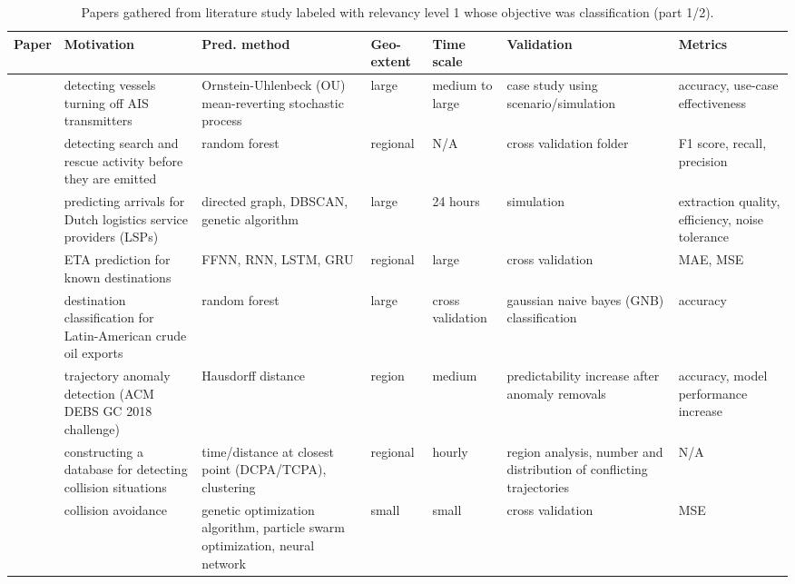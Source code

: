 \noindent
\begin{table}[htbp]
{\small\begin{tabularx}{1.2\textwidth}{p{0.6in} X X p{0.5in} p{0.4in} X p{0.5in}}
    \toprule
    \textbf{Paper} & \textbf{Motivation} & \textbf{Pred. method} & \textbf{Geo-extent} & \textbf{Time scale} & \textbf{Validation} & \textbf{Metrics} \\ \midrule
    \cite{Braca2018DetectingProcess} & detecting vessels turning off AIS transmitters & Ornstein-Uhlenbeck (OU) mean-reverting stochastic process & large & medium to large & case study using scenario/simulation & accuracy, use-case effectiveness \\ \midrule
    \cite{Chatzikokolakis2018MiningRescue} & detecting search and rescue activity before they are emitted & random forest & regional & N/A & cross validation folder & F1 score, recall, precision \\ \midrule
    \cite{Dobrkovic2015UsingData} & predicting arrivals for Dutch logistics service providers (LSPs) & directed graph, DBSCAN, genetic algorithm & large & 24 hours & simulation & extraction quality, efficiency, noise tolerance \\ \midrule
    \cite{ElMekkaoui2020PredictingData} & ETA prediction for known destinations & FFNN, RNN, LSTM, GRU & regional & large & cross validation & MAE, MSE \\ \midrule
    \cite{Jia2019LatinApproach} & destination classification for Latin-American crude oil exports & random forest & large & cross validation & gaussian naive bayes (GNB) classification & accuracy \\ \midrule
    \cite{Jung2019OutlierPrediction} & trajectory anomaly detection (ACM DEBS GC 2018 challenge) & Hausdorff distance & region & medium & predictability increase after anomaly removals & accuracy, model performance increase \\ \midrule
    \cite{Lei2020MiningData} & constructing a database for detecting collision situations & time/distance at closest point (DCPA/TCPA), clustering & regional & hourly & region analysis, number and distribution of conflicting trajectories & N/A \\ \midrule
    \cite{Ma2020OptimizedTrajectory} & collision avoidance & genetic optimization algorithm, particle swarm optimization, neural network & small & small & cross validation & MSE \\ \midrule
\end{tabularx}}
\caption{Papers gathered from literature study labeled with relevancy level 1 whose objective was classification (part 1/2).}
\label{tab:lit_review_cat_1_5}
\end{table}

